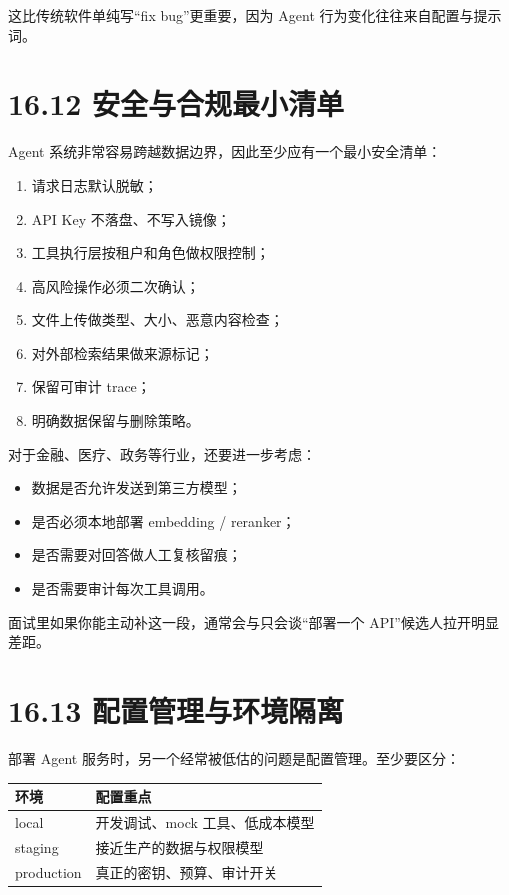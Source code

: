 这比传统软件单纯写``fix bug''更重要，因为 Agent 行为变化往往来自配置与提示词。


\section{16.12 安全与合规最小清单}

Agent 系统非常容易跨越数据边界，因此至少应有一个最小安全清单：


\begin{enumerate}[leftmargin=2em]
\item 请求日志默认脱敏；
\item API Key 不落盘、不写入镜像；
\item 工具执行层按租户和角色做权限控制；
\item 高风险操作必须二次确认；
\item 文件上传做类型、大小、恶意内容检查；
\item 对外部检索结果做来源标记；
\item 保留可审计 trace；
\item 明确数据保留与删除策略。
\end{enumerate}

对于金融、医疗、政务等行业，还要进一步考虑：


\begin{itemize}[leftmargin=2em]
\item 数据是否允许发送到第三方模型；
\item 是否必须本地部署 embedding / reranker；
\item 是否需要对回答做人工复核留痕；
\item 是否需要审计每次工具调用。
\end{itemize}

面试里如果你能主动补这一段，通常会与只会谈``部署一个 API''候选人拉开明显差距。


\section{16.13 配置管理与环境隔离}

部署 Agent 服务时，另一个经常被低估的问题是配置管理。至少要区分：


\begingroup
\scriptsize
\setlength{\tabcolsep}{3pt}
\begin{longtable}{|p{}|p{}|}
\hline
环境 & 配置重点 \\ \hline
local & 开发调试、mock 工具、低成本模型 \\ \hline
staging & 接近生产的数据与权限模型 \\ \hline
production & 真正的密钥、预算、审计开关 \\ \hline
\end{longtable}
\endgroup

